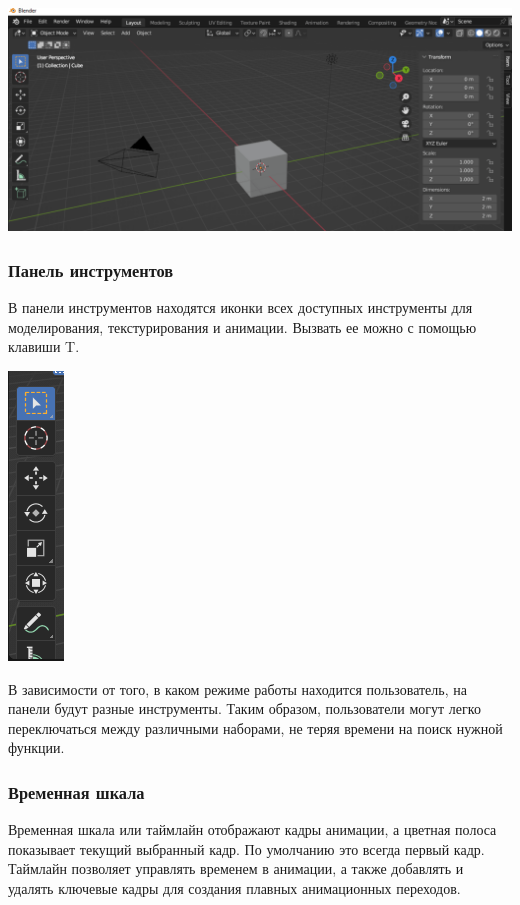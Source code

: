 \documentclass[12pt]{article}
\begin{document}
\vskip 1cm
{
    \centering
    \includegraphics[width=1\linewidth]{панель_свойств.png}
    \label{fig:i1}
}
\vskip 1cm

\subsubsection{ Панель инструментов}

В панели инструментов находятся иконки всех доступных инструменты для моделирования, текстурирования и анимации. Вызвать ее можно с помощью клавиши T.



\vskip 1cm
{
    \centering
    \includegraphics[width=0.07\linewidth]{панель_инструментов.png}
    \label{fig:i1}
}
\vskip 1cm

В зависимости от того, в каком режиме работы находится пользователь, на панели будут разные инструменты. Таким образом, пользователи могут легко переключаться между различными наборами, не теряя времени на поиск нужной функции.





\subsubsection{ Временная шкала}
Временная шкала или таймлайн отображают кадры анимации, а цветная полоса показывает текущий выбранный кадр. По умолчанию это всегда первый кадр. Таймлайн позволяет управлять временем в анимации, а также добавлять и удалять ключевые кадры для создания плавных анимационных переходов.
\end{document}
